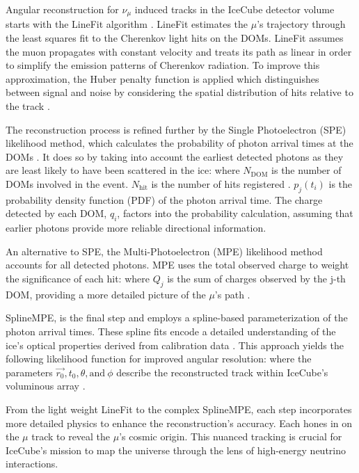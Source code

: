 Angular reconstruction for $\nu_\mu$ induced tracks in the IceCube detector volume starts with the LineFit algorithm \cite{AMANDA_trackreco}.
LineFit estimates the $\mu$'s trajectory through the least squares fit to the Cherenkov light hits on the DOMs.
LineFit assumes the muon propagates with constant velocity and treats its path as linear in order to simplify the emission patterns of Cherenkov radiation.
To improve this approximation, the Huber penalty function \cite{Huber:1964} is applied which distinguishes between signal and noise by considering the spatial distribution of hits relative to the track \cite{IC3_Calibration}.

The reconstruction process is refined further by the Single Photoelectron (SPE) likelihood method, which calculates the probability of photon arrival times at the DOMs \cite{Huber:1964}.
It does so by taking into account the earliest detected photons as they are least likely to have been scattered in the ice:
\spe
where $N_{\mathrm{DOM}}$ is the number of DOMs involved in the event.
$N_{\mathrm{hit}}$ is the number of hits registered \cite{AMANDA_trackreco}.
$p_j(t_i)$ is the probability density function (PDF) of the photon arrival time.
The charge detected by each DOM, $q_i$, factors into the probability calculation, assuming that earlier photons provide more reliable directional information.

An alternative to SPE, the Multi-Photoelectron (MPE) likelihood method accounts for all detected photons.
MPE uses the total observed charge to weight the significance of each hit:
\mpe
where $Q_j$ is the sum of charges observed by the j-th DOM, providing a more detailed picture of the $\mu$'s path \cite{AMANDA_trackreco}.

SplineMPE, is the final step and employs a spline-based parameterization of the photon arrival times.
These spline fits encode a detailed understanding of the ice's optical properties derived from calibration data \cite{AMANDA_trackreco}.
This approach yields the following likelihood function for improved angular resolution:
\splineMPE
where the parameters $\vec{r_0}, t_0, \theta, \mathrm{ and}~\phi$ describe the reconstructed track within IceCube's voluminous array \cite{AMANDA_trackreco}.

From the light weight LineFit to the complex SplineMPE, each step incorporates more detailed physics to enhance the reconstruction's accuracy.
Each hones in on the $\mu$ track to reveal the $\mu$'s cosmic origin.
This nuanced tracking is crucial for IceCube's mission to map the universe through the lens of high-energy neutrino interactions.

